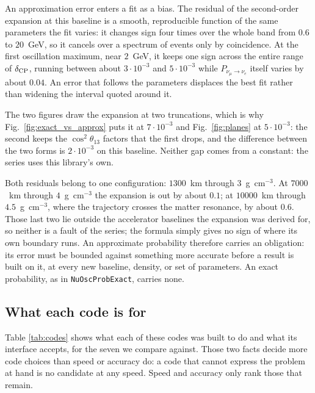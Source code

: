\documentclass[final,5p,times,twocolumn,sort,compress]{elsarticle}
\newcommand{\fig}{Fig.}
\newcommand{\figu}[1]{\fig~\ref{fig:#1}}
\begin{document}
An approximation error enters a fit as a bias.  The residual of the second-order expansion at this baseline is a smooth, reproducible function of the same parameters the fit varies: it changes sign four times over the whole band from $0.6$ to $20$~GeV, so it cancels over a spectrum of events only by coincidence.  At the first oscillation maximum, near $2$~GeV, it keeps one sign across the entire range of $\delta_{\rm CP}$, running between about $3 \cdot 10^{-3}$ and $5 \cdot 10^{-3}$ while $P_{\nu_\mu \to \nu_e}$ itself varies by about $0.04$.  An error that follows the parameters displaces the best fit rather than widening the interval quoted around it.

The two figures draw the expansion at two truncations, which is why \figu{exact_vs_approx} puts it at $7 \cdot 10^{-3}$ and \figu{planes} at $5 \cdot 10^{-3}$: the second keeps the $\cos^2\theta_{13}$ factors that the first drops, and the difference between the two forms is $2 \cdot 10^{-3}$ on this baseline.  Neither gap comes from a constant: the series uses this library's own.

Both residuals belong to one configuration: $1300$~km through $3$~g~cm$^{-3}$.  At $7000$~km through $4$~g~cm$^{-3}$ the expansion is out by about $0.1$; at $10000$~km through $4.5$~g~cm$^{-3}$, where the trajectory crosses the matter resonance, by about $0.6$.  Those last two lie outside the accelerator baselines the expansion was derived for, so neither is a fault of the series; the formula simply gives no sign of where its own boundary runs.  An approximate probability therefore carries an obligation: its error must be bounded against something more accurate before a result is built on it, at every new baseline, density, or set of parameters.  An exact probability, as in {\tt NuOscProbExact}, carries none.


\subsection{What each code is for}
\label{sec:capabilities}

Table \ref{tab:codes} shows what each of these codes was built to do and what its interface accepts, for the seven we compare against.  Those two facts decide more code choices than speed or accuracy do: a code that cannot express the problem at hand is no candidate at any speed.  Speed and accuracy only rank those that remain.
\end{document}
